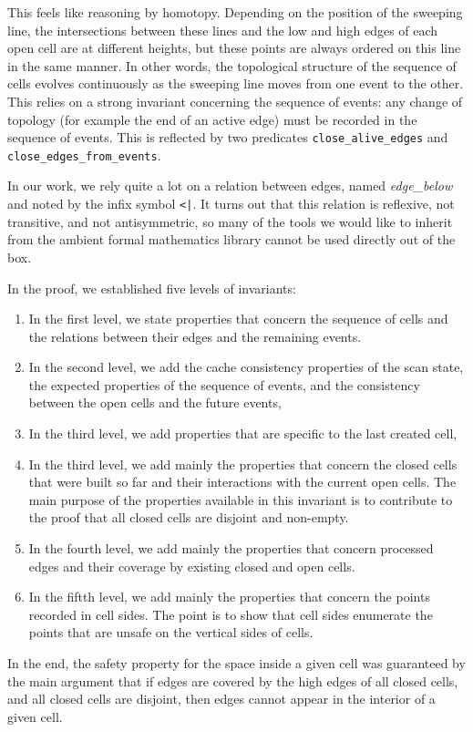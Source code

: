 \documentclass[a4paper, USenglish, cleveref, autoref, thm-restate]{lipics-v2021}
\begin{document}
This feels like reasoning by homotopy.  Depending on the position of
the sweeping line, the intersections between these lines and the low
and high edges of each open cell are at different heights, but these
points are always ordered on this line in the same manner.  In other
words, the topological structure of the sequence of cells evolves
continuously as the sweeping line moves from one event to the other.
This relies on a strong invariant concerning the sequence of events:
any change of topology (for example the end of an active edge) must be
recorded in the sequence of events.  This is reflected by two
predicates {\tt close\_alive\_edges} and {\tt close\_edges\_from\_events}.

In our work, we rely quite a lot on a relation between edges, named
{\em edge\_below} and noted by the infix symbol {\tt <|}.  It turns
out that this relation is reflexive, not transitive, and not
antisymmetric, so many of the tools we
would like to inherit from the ambient formal mathematics library
cannot be used directly out of the box.

In the proof, we established five levels of invariants:
\begin{enumerate}
\item In the first level, we state properties that concern the
sequence of cells and the relations between their edges and the remaining
events.
\item In the second level, we add the cache consistency properties of
  the scan state, the expected properties of the sequence of events,
  and the consistency between the open cells and the future events,
\item In the third level, we add properties that are specific to the
  last created cell,
\item In the third level, we add mainly the properties that concern
  the closed cells that were built so far and their interactions with
  the current open cells.  The main purpose of the properties
  available in this invariant is to contribute to the proof that
  all closed cells are disjoint and non-empty.
\item In the fourth level, we add mainly the properties that concern
  processed edges and their coverage by existing closed and open
  cells.
\item In the fiftth level, we add mainly the properties that concern
  the points recorded in cell sides.  The point is to show that cell
  sides enumerate the points that are unsafe on the vertical
  sides of cells.
\end{enumerate}
In the end, the safety property for the space inside a given cell was
guaranteed by the main argument that if edges are covered by the high
edges of all closed cells, and all closed cells are disjoint, then
edges cannot appear in the interior of a given cell.
\end{document}
